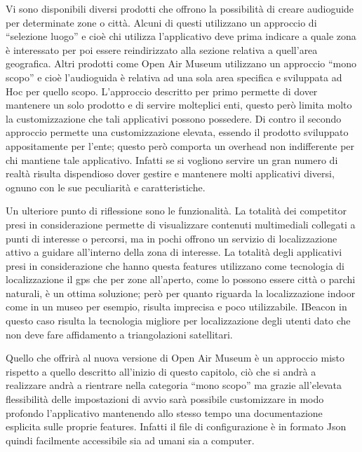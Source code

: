 Vi sono disponibili diversi prodotti che offrono la possibilità di creare audioguide per determinate zone o città. Alcuni di questi utilizzano un approccio di “selezione luogo” e cioè chi utilizza l’applicativo deve prima indicare a quale zona è interessato per poi essere reindirizzato alla sezione relativa a quell’area geografica. Altri prodotti come Open Air Museum utilizzano un approccio “mono scopo” e cioè l’audioguida è relativa ad una sola area specifica e sviluppata ad Hoc per quello scopo. L’approccio descritto per primo permette di dover mantenere un solo prodotto e di servire molteplici enti, questo però limita molto la customizzazione che tali applicativi possono possedere. Di contro il secondo approccio permette una customizzazione elevata, essendo il prodotto sviluppato appositamente per l’ente; questo però comporta un overhead non indifferente per chi mantiene tale applicativo. Infatti se si vogliono servire un gran numero di realtà risulta dispendioso dover gestire e mantenere molti applicativi diversi, ognuno con le sue peculiarità e caratteristiche.\vspace{5mm}

Un ulteriore punto di riflessione sono le funzionalità. La totalità dei competitor presi in considerazione permette di visualizzare contenuti multimediali collegati a punti di interesse o percorsi, ma in pochi offrono un servizio di localizzazione attivo a guidare all’interno della zona di interesse. La totalità degli applicativi presi in considerazione che hanno questa features utilizzano come tecnologia di localizzazione il gps che per zone all’aperto, come lo possono essere città o parchi naturali, è un ottima soluzione; però per quanto riguarda la localizzazione indoor come in un museo per esempio, risulta imprecisa e poco utilizzabile. IBeacon in questo caso risulta la tecnologia migliore per localizzazione degli utenti dato che non deve fare affidamento a triangolazioni satellitari.\vspace{5mm}

Quello che offrirà al nuova versione di Open Air Museum è un approccio misto rispetto a quello descritto all’inizio di questo capitolo, ciò che si andrà a realizzare andrà a rientrare nella categoria “mono scopo” ma grazie all’elevata flessibilità delle impostazioni di avvio sarà possibile customizzare in modo profondo l’applicativo mantenendo allo stesso tempo una documentazione esplicita sulle proprie features. Infatti il file di configurazione è in formato Json\cite{JSON} quindi facilmente accessibile sia ad umani sia a computer.\vspace{5mm}




